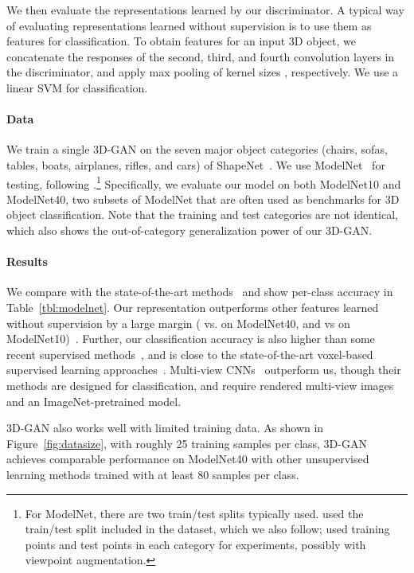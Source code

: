 \documentclass{article}
\newcommand{\fig}[1]{Figure~\ref{#1}}
\newcommand{\tbl}[1]{Table~\ref{#1}}
\newcommand{\model}{3D-GAN\xspace}
\newcommand{\myparagraph}[1]{\vspace{-10pt}\paragraph{#1}}
\begin{document}
We then evaluate the representations learned by our discriminator. A typical way of evaluating representations learned without supervision is to use them as features for classification. 
To obtain features for an input 3D object, we concatenate the responses of the second, third, and fourth convolution layers in the discriminator, and apply max pooling of kernel sizes , respectively. We use a linear SVM for classification.

\myparagraph{Data} We train a single \model on the seven major object categories (chairs, sofas, tables, boats, airplanes, rifles, and cars) of ShapeNet~\citep{chang2015shapenet}. We use ModelNet~\citep{wu20153d} for testing, following \cite{sharma2016vconv,maturana2015voxnet,qi2016volumetric}.\footnote{For ModelNet, there are two train/test splits typically used. \cite{qi2016volumetric,shi2015deeppano,maturana2015voxnet} used the train/test split included in the dataset, which we also follow; \cite{wu20153d,su2015multi,sharma2016vconv} used  training points and  test points in each category for experiments, possibly with viewpoint augmentation.} Specifically, we evaluate our model on both ModelNet10 and ModelNet40, two subsets of ModelNet that are often used as benchmarks for 3D object classification. Note that the training and test categories are not identical, which also shows the out-of-category generalization power of our \model.

\myparagraph{Results} We compare with the state-of-the-art methods~\citep{wu20153d,girdhar2016learning,sharma2016vconv,sedaghat2016orientation} and show per-class accuracy in \tbl{tbl:modelnet}. Our representation outperforms other features learned without supervision by a large margin ( vs.  on ModelNet40, and  vs  on ModelNet10)~\citep{girdhar2016learning,sharma2016vconv}. Further, our classification accuracy is also higher than some recent supervised methods~\citep{shi2015deeppano}, and is close to the state-of-the-art voxel-based supervised learning approaches~\citep{maturana2015voxnet,sedaghat2016orientation}. Multi-view CNNs~\citep{su2015multi,qi2016volumetric} outperform us, though their methods are designed for classification, and require rendered multi-view images and an ImageNet-pretrained model.

\model also works well with limited training data. As shown in \fig{fig:datasize}, with roughly 25 training samples per class, \model achieves comparable performance on ModelNet40 with other unsupervised learning methods trained with at least 80 samples per class.
\end{document}
